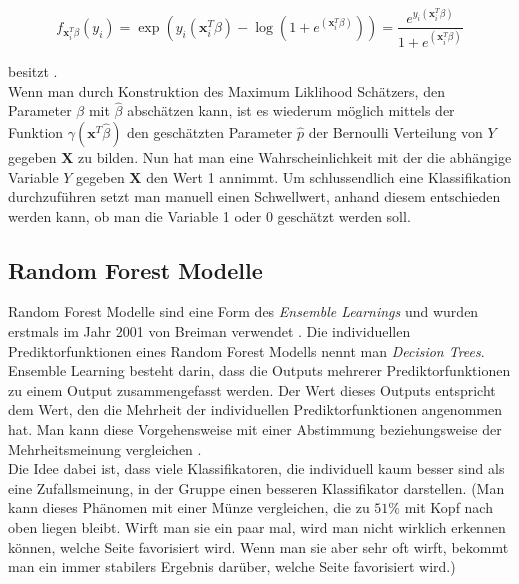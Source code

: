 $$ f_{\mathbf{x}_i^T\beta}(y_i) = \exp( y_i(\mathbf{x}_i^T\beta) - \log(1 + e^{(\mathbf{x}_i^T\beta)})) = \frac{e^{y_i(\mathbf{x}_i^T\beta)}}{1 + e^{(\mathbf{x}_i^T\beta)}}$$

besitzt \cite[Seite 223]{wasserman}. \\ %

Wenn man durch Konstruktion des Maximum Liklihood Sch\"atzers, den Parameter $\beta$ mit $\hat{\beta}$ absch\"atzen kann, ist es wiederum m\"oglich mittels der Funktion $\gamma(\mathbf{x}^T\hat{\beta})$
den gesch\"atzten Parameter $\hat{p}$ der Bernoulli Verteilung von $Y$ gegeben $\mathbf{X}$ zu bilden. Nun hat man eine Wahrscheinlichkeit mit der die abh\"angige Variable $Y$ gegeben $\mathbf{X}$ den Wert 1 annimmt.
Um schlussendlich eine Klassifikation durchzuf\"uhren setzt man manuell einen Schwellwert, anhand diesem entschieden werden kann, ob man die Variable 1 oder 0 gesch\"atzt werden soll. 
























\subsection{Random Forest Modelle}
Random Forest Modelle sind eine Form des \textit{Ensemble Learnings} und wurden erstmals im Jahr 2001 von Breiman verwendet \cite{breiman2001random}. 
Die individuellen Prediktorfunktionen eines Random 
Forest Modells nennt man \textit{Decision Trees}.
Ensemble Learning besteht darin, dass die Outputs mehrerer Prediktorfunktionen zu einem Output zusammengefasst werden. Der Wert dieses Outputs entspricht
dem Wert, den die Mehrheit der individuellen Prediktorfunktionen angenommen hat.
Man kann diese Vorgehensweise mit einer Abstimmung beziehungsweise der Mehrheitsmeinung vergleichen \cite[Seiten 189 bis 191]{handson}. \\

Die Idee dabei ist, dass viele Klassifikatoren, die individuell kaum besser sind als eine Zufallsmeinung, in der Gruppe einen 
besseren Klassifikator darstellen. (Man kann dieses Ph\"anomen mit einer M\"unze vergleichen, die zu $51\%$ mit Kopf nach oben liegen bleibt. Wirft 
man sie ein paar mal, wird man nicht wirklich erkennen k\"onnen, welche Seite favorisiert wird. Wenn man sie aber sehr oft wirft, bekommt man 
ein immer stabilers Ergebnis dar\"uber, welche Seite favorisiert wird.) \\

